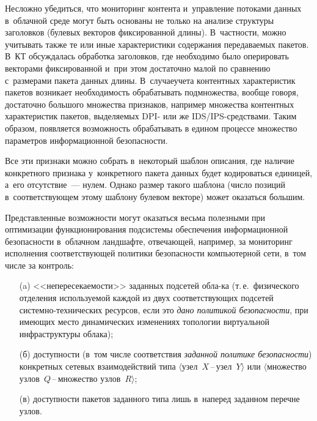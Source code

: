 \begin{multicols}{2}
  Несложно убедиться, что мониторинг контента и~управление потоками 
данных в~облачной среде могут быть основаны не только на анализе структуры 
заголовков (булевых векторов фиксированной длины). В~частности, можно 
учитывать также те или иные характеристики содержания переда\-ва\-емых 
пакетов. В~КТ обсуждалась обработка заголовков, где необходимо было 
оперировать векторами фиксированной и~при этом достаточно малой по 
сравнению с~размерами пакета данных длины. В~случае\linebreak учета контентных 
характеристик пакетов возни\-кает необходимость обрабатывать подмножества,\linebreak 
вообще говоря, достаточно большого множества признаков, например 
множества контентных характеристик пакетов, выделяемых DPI- или же 
IDS/IPS-сред\-ст\-ва\-ми. Таким образом, появляется возможность обрабатывать 
в едином процессе множество параметров информационной безопасности.
{ %

}
  
  Все эти признаки можно собрать в~некоторый шаблон описания, где наличие 
конкретного признака у~конкретного пакета данных будет кодироваться 
единицей, а~его отсутствие~--- нулем. Однако размер такого шаблона (число 
позиций в~соответствующем этому шаблону булевом векторе) может оказаться 
большим. 
  
  Представленные возможности могут оказаться весьма полезными при 
оптимизации функци\-о\-нирования подсистемы обеспечения информа\-ционной 
безопасности в~облачном ландшафте, отвеча\-ющей, например, за мониторинг 
исполнения соответствующей политики безопасности компьютерной сети, 
в~том числе за контроль:\\[-14pt]
  \begin{itemize}
\item[(a)] <<непересекаемости>> заданных подсетей обла-\linebreak ка (т.\,е.\ 
физического отделения используемой каж\-дой из двух соответствующих 
подсетей сис\-тем\-но-тех\-ни\-че\-ских ресурсов, если это \textit{дано полити\-кой 
безопасности}, при имеющих мес\-то динамических изменениях топологии 
виртуальной инфраструктуры облака);
\item[(б)] доступности (в~том числе соответствия \textit{заданной политике 
безопасности}) конкретных сетевых взаимодействий типа 
$\langle${узел}~$X$\,--\,{узел}~$Y$$\rangle$ или 
$\langle${мно\-же\-ст\-во узлов}~$Q$\,--\,{множество 
узлов}~$R$$\rangle$;
\item[(в)] доступности пакетов заданного типа лишь в~наперед заданном 
перечне узлов.
\end{itemize}


\end{multicols}
